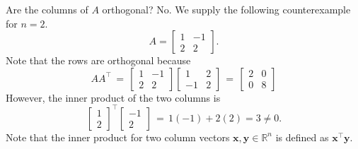 \documentclass[handout]{beamer}
\def\x{\bm{x}}
\def\y{\bm{y}}
\begin{document}
        \begin{frame}{Are the columns of $A$ orthogonal?}
                No. We supply the following counterexample for $n = 2$.
                \[
                        A = \begin{bmatrix}
                                1 & -1 \\ 2 & 2
                        \end{bmatrix}.
                \]
                Note that the rows are orthogonal because 
                \[
                        A A^\top \,=\, \begin{bmatrix}
                                1 & -1 \\ 2 & 2
                        \end{bmatrix}
                        \begin{bmatrix}
                                1 & 2 \\ -1 & 2
                        \end{bmatrix}
                        \,=\, \begin{bmatrix}
                                2 & 0 \\ 0 & 8
                        \end{bmatrix}
                \]
                \pause
                However, the inner product of the two columns is
                \[
                        \begin{bmatrix}
                                1 \\ 2
                        \end{bmatrix}^\top
                        \begin{bmatrix}
                                -1 \\ 2
                        \end{bmatrix}
                        \,=\, 1(-1) + 2(2) = 3 \neq 0.
                \]
                Note that the inner product for two column vectors $\x, \y \in \mathbb{R}^n$ is defined as $\x^\top\y$.
        \end{frame}
\end{document}
